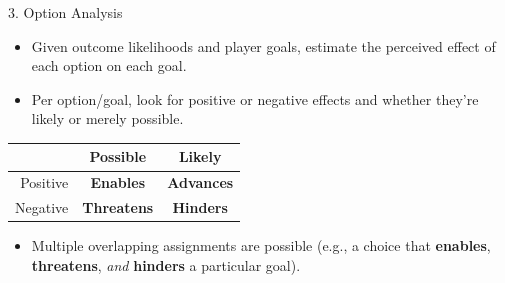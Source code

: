 \documentclass[xcolor=x11names]{beamer}
\begin{document}
\begin{frame}{3. Option Analysis}
  \begin{itemize}\addtolength{\itemsep}{0.5\baselineskip}
    \item Given outcome likelihoods and player goals, estimate the perceived effect of each option on each goal.
    \item Per option/goal, look for positive or negative effects and whether they're likely or merely possible.
  \end{itemize}
  \vfill
  \centering
  \begin{tabular}{r c c}
    \toprule
           & Possible & Likely \\
    \midrule
    Positive    & \textbf{Enables}  & \textbf{Advances} \\
    Negative & \textbf{Threatens} & \textbf{Hinders} \\
    \bottomrule
  \end{tabular}
  \vfill
  \raggedright
  \begin{itemize}\addtolength{\itemsep}{0.5\baselineskip}
    \item Multiple overlapping assignments are possible (e.g., a choice that \textbf{enables}, \textbf{threatens}, \emph{and} \textbf{hinders} a particular goal).
  \end{itemize}
\end{frame}
\end{document}
